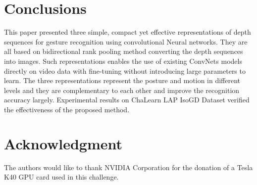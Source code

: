 \documentclass[10pt, a4paper, conference]{IEEEtran}
\begin{document}
\section{Conclusions}

This paper presented three simple, compact yet effective representations of depth sequences for gesture recognition using convolutional Neural networks. They are all based on bidirectional rank pooling method converting the depth sequences into images. Such representations enables the use of existing ConvNets models directly on video data with fine-tuning without introducing large parameters to learn. The three representations represent the posture and motion in different levels and they are complementary to each other and improve the recognition accuracy largely. Experimental results on ChaLearn LAP IsoGD Dataset verified the effectiveness of the proposed method.



\section*{Acknowledgment}
The authors would like to thank NVIDIA Corporation for the donation of a Tesla K40 GPU card used in this challenge.
\end{document}
